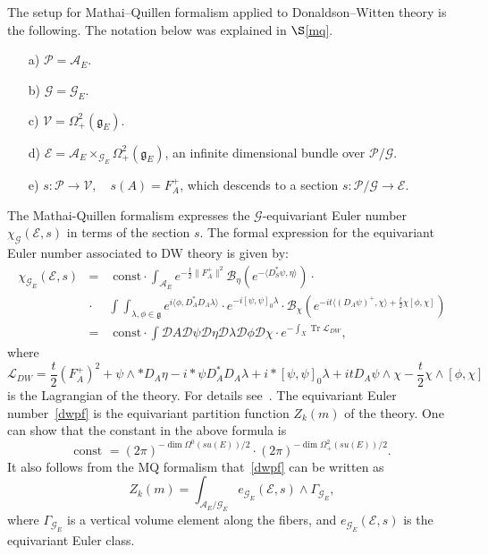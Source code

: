 \documentclass[a4paper,12pt,reqno,sumlimits]{amsart}
\theoremstyle{plain}
\theoremstyle{definition}
\newcommand{\1}{{\bf 1}}
\newcommand{\g}{{\mathfrak  g}}
\newcommand{\ex}[1]{{e^{#1}}}
\newcommand{\calA}{{\mathcal A}}
\newcommand{\calB}{{\mathcal B}}
\newcommand{\calD}{{\mathcal D}}
\newcommand{\calE}{{\mathcal E}}
\newcommand{\calG}{{\mathcal G}}
\newcommand{\calP}{{\mathcal P}}
\newcommand{\calL}{{\mathcal L}}
\newcommand{\calV}{{\mathcal V}}
\renewcommand{\to}{\longrightarrow}
\newcommand{\Tr}{\operatorname{Tr}}
\newcommand{\ip}[1]{\langle #1 \rangle}
\newcommand{\norm}[1]{\| #1 \|}
\numberwithin{equation}{section}
\begin{document}
The setup for Mathai--Quillen formalism applied to Donaldson--Witten theory
is the following. The notation below was explained in $\S$\ref{mq}.
\begin{itemize}
\item[a)] $\calP=\calA_E$.
\item[b)] $\calG=\calG_E$.
\item[c)] $\calV=\Omega^2_+(\g_E)$.
\item[d)] $\calE=\calA_E\times_{\calG_E}\Omega^2_+(\g_E)$, an infinite
  dimensional bundle over $\calP/\calG$.
\item[e)] $s:\calP\to\calV,\quad s(A)=F_A^+$, which descends to a section
  $s:\calP/\calG\to\calE$.
\end{itemize}
The Mathai-Quillen formalism expresses the $\calG$-equivariant Euler number
$\chi_{\calG}(\calE,s)$ in terms of the section $s$. The formal expression
for the equivariant Euler number associated to DW theory is given by:
\begin{eqnarray}
  \label{dwpf}
  \chi_{\calG_E}(\calE,s)&=&\text{ const}\cdot\int_{\calA_E}
  \ex{-\frac{t}{2}\norm{F_A^+}^2}
  \calB_\eta\left(\ex{-\ip{D_S^*\psi,\eta}}\right)\cdot\nonumber\\
  &\cdot&\int\int_{\lambda,\phi\in\g}\ex{i\ip{\phi,D_A^* D_A\lambda}}
  \cdot\ex{-i[\psi,\psi]_0\lambda}\cdot
  \calB_\chi\left(\ex{-it\ip{(D_A\psi)^+,\chi}+\frac{t}{2}\chi[\phi,\chi]}
  \right)\nonumber\\
  &=&\text{ const}\cdot\int\calD A\calD\psi\calD\eta\calD\lambda\calD\phi
  \calD\chi\cdot\ex{-\int_X\Tr{\calL_{DW}}},
\end{eqnarray}
where
\begin{equation*}
  \calL_{DW}=\frac{t}{2}(F_A^+)^2 + \psi\wedge *D_A\eta
  - i *\psi D_A^* D_A\lambda + i *[\psi,\psi]_0\lambda
  +it D_A\psi\wedge\chi - \frac{t}{2}\chi\wedge[\phi,\chi]
\end{equation*}
is the Lagrangian of the theory. For details see~\cite[Sec 3.1]{radu}. The
equivariant Euler number~\eqref{dwpf} is the equivariant partition function
$Z_k(m)$ of the theory.  One can show that the constant in the above formula
is
$$
\text{const }=(2\pi)^{-\dim{\Omega^0(su(E))/2}}\cdot
(2\pi)^{-\dim{\Omega^2_+(su(E))/2}}.
$$
It also follows from the MQ formalism that~\eqref{dwpf} can be written as
\begin{equation}
  \label{dwmqpf}
  Z_k(m)=\int_{\calA_E/\calG_E} e_{\calG_E}(\calE,s)\wedge\Gamma_{\calG_E},
\end{equation}
where $\Gamma_{\calG_E}$ is a vertical volume element along the fibers, and
$e_{\calG_E}(\calE,s)$ is the equivariant Euler class.
\end{document}
